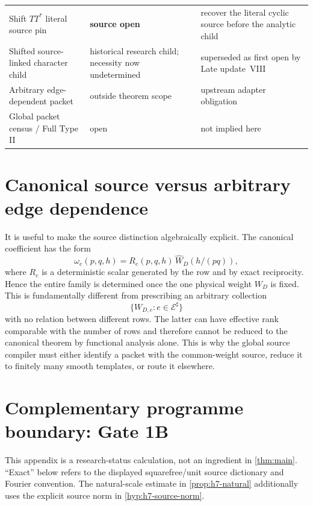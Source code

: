 \documentclass[11pt]{article}
\theoremstyle{definition}
\newcommand{\1}{\mathbf 1}
\newcommand{\E}{\mathcal E}
\begin{document}
\begin{center}
\begin{tabular}{p{} p{} p{}}
Shift $TT^*$ literal source pin & \textbf{source open} & recover the literal cyclic source before the analytic child\\
Shifted source-linked character child & historical research child; necessity now undetermined & superseded as first open by Late update~VIII\\
Arbitrary edge-dependent packet & outside theorem scope & upstream adapter obligation\\
Global packet census / Full Type II & open & not implied here\\
\bottomrule
\end{tabular}
\end{center}
\section{Canonical source versus arbitrary edge dependence}
\label{app:edge-dependence}

It is useful to make the source distinction algebraically explicit.  The
canonical coefficient has the form
\[
   \omega_e(p,q,h)
   =R_e(p,q,h)\,\widehat W_D(h/(pq)),
\]
where $R_e$ is a deterministic scalar generated by the row and by exact
reciprocity.  Hence the entire family is determined once the one physical
weight $W_D$ is fixed.  This is fundamentally different from prescribing an
arbitrary collection
\[
   \{W_{D,e}:e\in\E^\sharp\}
\]
with no relation between different rows.  The latter can have effective rank
comparable with the number of rows and therefore cannot be reduced to the
canonical theorem by functional analysis alone.  This is why the global
source compiler must either identify a packet with the common-weight source,
reduce it to finitely many smooth templates, or route it elsewhere.



\section{Complementary programme boundary: Gate 1B}
\label{app:gate1b-frontier}
This appendix is a research-status calculation, not an ingredient in
\cref{thm:main}.  ``Exact'' below refers to the displayed squarefree/unit
source dictionary and Fourier convention.  The natural-scale estimate in
\cref{prop:h7-natural} additionally uses the explicit source norm in
\cref{hyp:h7-source-norm}.
\end{document}

